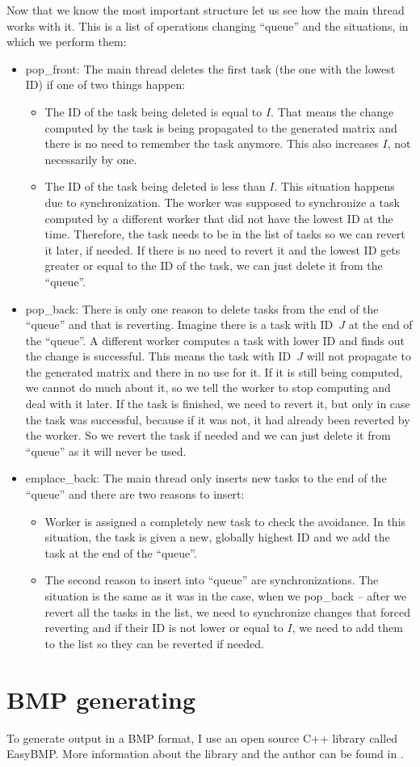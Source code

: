 Now that we know the most important structure let us see how the main thread works with it. This is a list of operations changing ``queue'' and the situations, in which we perform them:
\begin{itemize}
\item pop\_front: The main thread deletes the first task (the one with the lowest ID) if one of two things happen:
\begin{itemize}
\item The ID of the task being deleted is equal to $I$. That means the change computed by the task is being propagated to the generated matrix and there is no need to remember the task anymore. This also increases $I$, not necessarily by one.
\item The ID of the task being deleted is less than $I$. This situation happens due to synchronization. The worker was supposed to synchronize a task computed by a different worker that did not have the lowest ID at the time. Therefore, the task needs to be in the list of tasks so we can revert it later, if needed. If there is no need to revert it and the lowest ID gets greater or equal to the ID of the task, we can just delete it from the ``queue''.
\end{itemize}
\item pop\_back: There is only one reason to delete tasks from the end of the ``queue'' and that is reverting. Imagine there is a task with ID~$J$ at the end of the ``queue''. A different worker computes a task with lower ID and finds out the change is successful. This means the task with ID~$J$ will not propagate to the generated matrix and there in no use for it. If it is still being computed, we cannot do much about it, so we tell the worker to stop computing and deal with it later. If the task is finished, we need to revert it, but only in case the task was successful, because if it was not, it had already been reverted by the worker. So we revert the task if needed and we can just delete it from ``queue'' as it will never be used.
\item emplace\_back: The main thread only inserts new tasks to the end of the ``queue'' and there are two reasons to insert:
\begin{itemize}
\item Worker is assigned a completely new task to check the avoidance. In this situation, the task is given a new, globally highest ID and we add the task at the end of the ``queue''.
\item The second reason to insert into ``queue'' are synchronizations. The situation is the same as it was in the case, when we pop\_back -- after we revert all the tasks in the list, we need to synchronize changes that forced reverting and if their ID is not lower or equal to $I$, we need to add them to the list so they can be reverted if needed.
\end{itemize}
\end{itemize}

\section{BMP generating}
To generate output in a BMP format, I use an open source C++ library called EasyBMP. More information about the library and the author can be found in \cite{EasyBMP}.